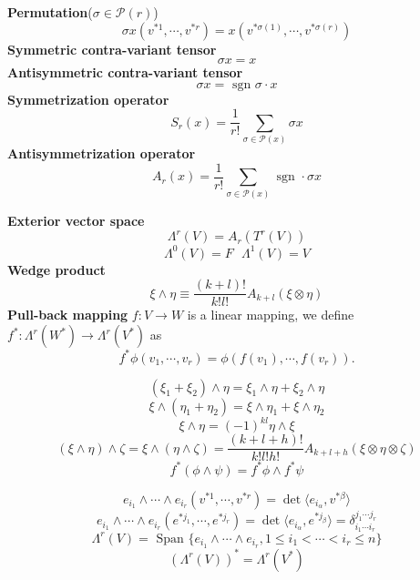 \begin{newdef}
\textbf{Permutation}($\sigma \in \mathcal{P}(r)$)
\[\sigma x(v^{*1},\cdots,v^{*r})=x(v^{*\sigma(1)},\cdots,v^{*\sigma(r)})\]
\textbf{Symmetric contra-variant tensor}
\[\sigma x =x\]
\textbf{Antisymmetric contra-variant tensor}
\[\sigma x =\mbox{ sgn }\sigma \cdot x\]
\textbf{Symmetrization operator}
\[S_r(x) = \frac{1}{r!} \sum_{\sigma \in \mathcal{P}(x)} \sigma x\]
\textbf{Antisymmetrization operator}
\[A_r(x) = \frac{1}{r!} \sum_{\sigma \in \mathcal{P}(x)} \mbox{ sgn }\cdot \sigma x\]
\end{newdef}

\begin{newdef}
\textbf{Exterior vector space}
\[\Lambda^r(V) = A_r(T^r(V))\]
\[\Lambda^0(V)=F \ \ \ \Lambda^1(V)=V\]
\textbf{Wedge product}
\[\xi \wedge \eta \equiv \frac{(k+l)!}{k!l!}A_{k+l}(\xi \otimes \eta)\]
\textbf{Pull-back mapping}
$f:V \to W$ is a linear mapping, we define $f^*:\Lambda^r(W^*) \to \Lambda^r(V^*)$ as
\[f^* \phi(v_1,\cdots,v_r) = \phi(f(v_1),\cdots,f(v_r)).\]
\end{newdef}

\begin{newprop}
\[(\xi_1+\xi_2) \wedge \eta = \xi_1 \wedge \eta + \xi_2 \wedge \eta\]
\[\xi \wedge (\eta_1+\eta_2) = \xi \wedge \eta_1 + \xi \wedge \eta_2\]
\[\xi \wedge \eta = (-1)^{kl} \eta \wedge \xi\]
\[(\xi \wedge \eta) \wedge \zeta = \xi \wedge (\eta \wedge \zeta) = \frac{(k+l+h)!}{k!l!h!}A_{k+l+h}(\xi \otimes \eta \otimes \zeta)\]
\[f^*(\phi \wedge \psi) = f^*\phi \wedge f^*\psi\]
\end{newprop}

\begin{newprop}
\[e_{i_1} \wedge \cdots \wedge e_{i_r}(v^{*1},\cdots,v^{*r}) = \det \langle e_{i_{\alpha}},v^{*\beta} \rangle\]
\[e_{i_1} \wedge \cdots \wedge e_{i_r}(e^{*j_1},\cdots,e^{*j_r}) = \det \langle e_{i_{\alpha}},e^{*j_{\beta}} \rangle = \delta^{j_1 \cdots j_r}_{i_1 \cdots i_r}\]
\[\Lambda^r(V) = \mbox{ Span }\{e_{i_1} \wedge \cdots \wedge e_{i_r},1\leq i_1 < \cdots < i_r \leq n  \}\]
\[(\Lambda^r(V))^* = \Lambda^r(V^*)\]
\end{newprop}

